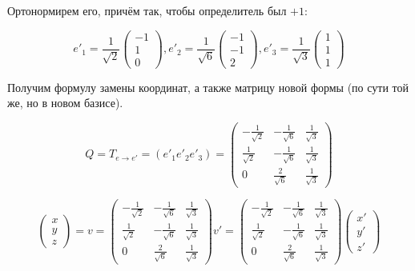 \documentclass[12pt, a4paper]{article}
\begin{document}
    Ортонормирем его, причём так, чтобы определитель был $\mathbb{+}1$:

    \begin{equation}
        e'_1 = \frac{1}{\sqrt{2}} \begin{pmatrix}
            -1 \\ 1 \\ 0
        \end{pmatrix}, 
        e'_2 = \frac{1}{\sqrt{6}} \begin{pmatrix}
            -1 \\ -1 \\ 2
        \end{pmatrix}, 
        e'_3 = \frac{1}{\sqrt{3}} \begin{pmatrix}
            1 \\ 1 \\ 1
        \end{pmatrix}
    \end{equation}

    Получим формулу замены координат, а также матрицу новой формы (по сути той же, но в новом базисе).

    \begin{equation}
        Q = T_{e → e'} = (e'_1 e'_2 e'_3) = \begin{pmatrix}
            -\frac{1}{\sqrt{2}} & -\frac{1}{\sqrt{6}} & \frac{1}{\sqrt{3}} \\
            \frac{1}{\sqrt{2}}  & -\frac{1}{\sqrt{6}} & \frac{1}{\sqrt{3}} \\
            0                   & \frac{2}{\sqrt{6}}  & \frac{1}{\sqrt{3}}
        \end{pmatrix}
    \end{equation}

    \begin{equation}
        \begin{pmatrix}
            x \\ y \\ z
        \end{pmatrix} = v = \begin{pmatrix}
            -\frac{1}{\sqrt{2}} & -\frac{1}{\sqrt{6}} & \frac{1}{\sqrt{3}} \\
            \frac{1}{\sqrt{2}}  & -\frac{1}{\sqrt{6}} & \frac{1}{\sqrt{3}} \\
            0                   & \frac{2}{\sqrt{6}}  & \frac{1}{\sqrt{3}}
        \end{pmatrix} v' = \begin{pmatrix}
            -\frac{1}{\sqrt{2}} & -\frac{1}{\sqrt{6}} & \frac{1}{\sqrt{3}} \\
            \frac{1}{\sqrt{2}}  & -\frac{1}{\sqrt{6}} & \frac{1}{\sqrt{3}} \\
            0                   & \frac{2}{\sqrt{6}}  & \frac{1}{\sqrt{3}}
        \end{pmatrix} \begin{pmatrix}
            x' \\ y' \\ z'
        \end{pmatrix}
    \end{equation}
\end{document}
